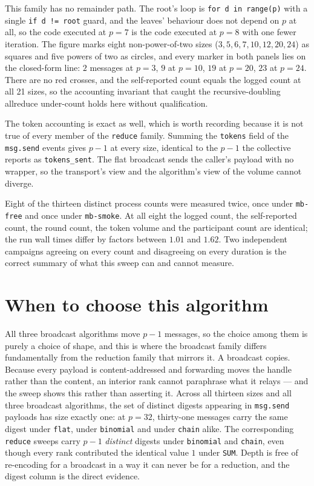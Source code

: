 \documentclass[11pt]{article}
\begin{document}
This family has no remainder path. The root's loop is \texttt{for d in range(p)} with a
single \texttt{if d != root} guard, and the leaves' behaviour does not depend on $p$ at all,
so the code executed at $p=7$ is the code executed at $p=8$ with one fewer iteration. The
figure marks eight non-power-of-two sizes ($3, 5, 6, 7, 10, 12, 20, 24$) as squares and five
powers of two as circles, and every marker in both panels lies on the closed-form line: $2$
messages at $p=3$, $9$ at $p=10$, $19$ at $p=20$, $23$ at $p=24$. There are no red crosses,
and the self-reported count equals the logged count at all 21 sizes, so the accounting
invariant that caught the recursive-doubling allreduce under-count holds here without
qualification.

The token accounting is exact as well, which is worth recording because it is not true of
every member of the \texttt{reduce} family. Summing the \texttt{tokens} field of the
\texttt{msg.send} events gives $p-1$ at every size, identical to the $p-1$ the collective
reports as \texttt{tokens\_sent}. The flat broadcast sends the caller's payload with no
wrapper, so the transport's view and the algorithm's view of the volume cannot diverge.

Eight of the thirteen distinct process counts were measured twice, once under \texttt{mb-free}
and once under \texttt{mb-smoke}. At all eight the logged count, the self-reported count, the
round count, the token volume and the participant count are identical; the run wall times
differ by factors between $1.01$ and $1.62$. Two independent campaigns agreeing on every
count and disagreeing on every duration is the correct summary of what this sweep can and
cannot measure.

\section{When to choose this algorithm}

All three broadcast algorithms move $p-1$ messages, so the choice among them is purely a
choice of shape, and this is where the broadcast family differs fundamentally from the
reduction family that mirrors it. A broadcast copies. Because every payload is
content-addressed and forwarding moves the handle rather than the content, an interior rank
cannot paraphrase what it relays --- and the sweep shows this rather than asserting it. Across
all thirteen sizes and all three broadcast algorithms, the set of distinct digests appearing
in \texttt{msg.send} payloads has size exactly one: at $p=32$, thirty-one messages carry the
same digest under \texttt{flat}, under \texttt{binomial} and under \texttt{chain} alike. The
corresponding \texttt{reduce} sweeps carry $p-1$ \emph{distinct} digests under
\texttt{binomial} and \texttt{chain}, even though every rank contributed the identical value
$1$ under \texttt{SUM}. Depth is free of re-encoding for a broadcast in a way it can never be
for a reduction, and the digest column is the direct evidence.
\end{document}
